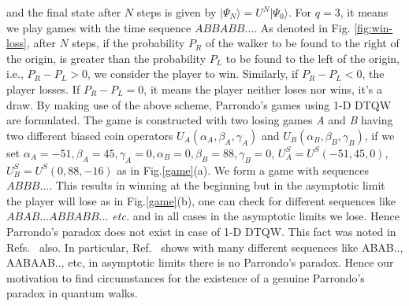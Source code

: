 \documentclass[english,aps,pra,amsmath,amssymb,showpacs,notitlepage,onecolumn]{revtex4-1}
\begin{document}
and the final state after $N$ steps is given by $\vert\Psi_{N}\rangle=U^{N}\vert\Psi_{0}\rangle$. For $q=3$, it means we play games with the time sequence $ABBABB\ldots$. As denoted in Fig. \ref{fig:win-loss}, after $N$ steps, if the probability $P_{R}$ of the walker to be found to the right of the origin, is greater than the probability $P_{L}$ to be found to the left of the origin, i.e., $P_{R}-P_{L}>0$, we consider the player to win. Similarly, if $P_{R}-P_{L}<0$, the player losses. If $P_{R}-P_{L}=0$, it means the player neither loses nor wins, it's a draw. By making use of the above scheme, Parrondo's games using 1-D DTQW are formulated. The game is constructed with two losing games \emph{A} and \emph{B} having two different biased coin operators $U_{A} (\alpha_{A},\beta_{A},\gamma_{A})$ and $U_{B}(\alpha_{B},\beta_{B},\gamma_{B})$, if we set $\alpha_A=-51,\beta_{A}=45,\gamma_{A}=0,\alpha_{B}=0,\beta_{B}=88,\gamma_B=0$,  $U_{A}^{S}=U^{S}(-51,45,0)$, $U_{B}^{S}=U^{S}(0,88,-16)$ as in Fig.\ref{game}(a). We form a game with sequences \emph{$ABBB\ldots$}. This results in winning at the beginning but in the asymptotic limit the player will lose as in Fig.\ref{game}(b), one can check for different sequences like \emph{$ABAB\ldots ABBABB\ldots$ etc.} and in all cases in the asymptotic limits we lose. Hence Parrondo's paradox does not exist in case of 1-D DTQW. This fact was noted in Refs.~\cite{flitney,minli} also. In particular, Ref.~\cite{flitney} shows with many different sequences like ABAB.., AABAAB.., etc, in asymptotic limits there is no Parrondo's paradox. Hence our motivation to find circumstances for the existence of a genuine Parrondo's paradox in quantum walks. 
\end{document}
